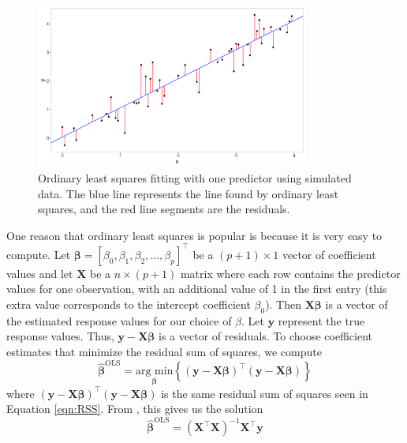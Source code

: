 \documentclass{article}
\newcommand{\argmin}[2]{\underset{#1}{\text{arg min}}\left\{#2\right\}}
\begin{document}
	\begin{figure}[!h]
		\centering
		\includegraphics[width = 0.8\textwidth]{images/ols.png}
		\captionsetup{width = 0.8\textwidth}
		\caption{Ordinary least squares fitting with one predictor using simulated data. The blue line represents the line found by ordinary least squares, and the red line segments are the residuals.}
		\label{fig:ols}
	\end{figure}
	
	One reason that ordinary least squares is popular is because it is very easy to compute. Let $\bm{\beta} = [\beta_0, \beta_1, \beta_2, \dotsc, \beta_p]^\top$ be a $(p + 1) \times 1$ vector of coefficient values and let $\mathbf{X}$ be a $n\times (p + 1)$ matrix where each row contains the predictor values for one observation, with an additional value of 1 in the first entry (this extra value corresponds to the intercept coefficient $\beta_0$). Then $\mathbf{X}\bm{\beta}$ is a vector of the estimated response values for our choice of $\beta$. Let $\mathbf{y}$ represent the true response values. Thus, $\mathbf{y} - \mathbf{X}\bm{\beta}$ is a vector of residuals. To choose coefficient estimates that minimize the residual sum of squares, we compute
	\begin{equation}
		\hat{\bm{\beta}}^{\text{OLS}} = \argmin{\bm{\beta}}{(\mathbf{y} - \mathbf{X}\bm{\beta})^\top (\mathbf{y} - \mathbf{X}\bm{\beta})}
	\end{equation}
	where $(\mathbf{y} - \mathbf{X}\bm{\beta})^\top (\mathbf{y} - \mathbf{X}\bm{\beta})$ is the same residual sum of squares seen in Equation \ref{eqn:RSS}. From \cite{friedman2001elements}, this gives us the solution
	\begin{equation}\label{eqn:ols-solution}
		\hat{\bm{\beta}}^{\text{OLS}} = (\mathbf{X}^\top \mathbf{X})^{-1} \mathbf{X}^\top \mathbf{y}
	\end{equation}
	
\end{document}
